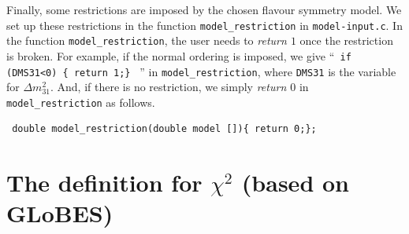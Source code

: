 \documentclass[aps,prd,nofootinbib,preprint]{revtex4}
\begin{document}
Finally, some restrictions are imposed by the chosen flavour symmetry model. We set up these restrictions in the function \texttt{model\_restriction} in \texttt{model-input.c}. In the function \texttt{model\_restriction}, the user needs to \textit{return $1$} once the restriction is broken. For example, if the normal ordering is imposed, we give ``\texttt{ if (DMS31<0) \{ return 1;\} } '' in \texttt{model\_restriction}, where \texttt{DMS31} is the variable for $\Delta m_{31}^2$. %
And, if there is no restriction, we simply \textit{return $0$} in \texttt{model\_restriction} as follows.
\begin{verbatim}
 double model_restriction(double model []){ return 0;};
\end{verbatim}


\section{The definition for $\chi^2$ (based on \textbf{GLoBES})}\label{sec:chi-squared}
\end{document}
